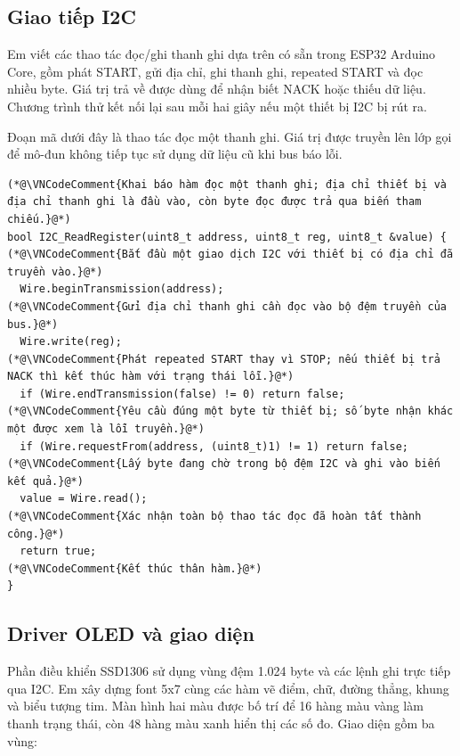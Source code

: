 \documentclass[12pt]{article}
\begin{document}
\subsection{Giao tiếp I2C}

Em viết các thao tác đọc/ghi thanh ghi dựa trên  có sẵn trong ESP32 Arduino Core, gồm phát START, gửi địa chỉ, ghi thanh ghi, repeated START và đọc nhiều byte. Giá trị trả về được dùng để nhận biết NACK hoặc thiếu dữ liệu. Chương trình thử kết nối lại sau mỗi hai giây nếu một thiết bị I2C bị rút ra.

Đoạn mã dưới đây là thao tác đọc một thanh ghi. Giá trị  được truyền lên lớp gọi để mô-đun không tiếp tục sử dụng dữ liệu cũ khi bus báo lỗi.

\Needspace{0.26\textheight}
\begin{lstlisting}[style=firmware,caption={Đọc thanh ghi I2C và kiểm tra lỗi truyền}]
(*@\VNCodeComment{Khai báo hàm đọc một thanh ghi; địa chỉ thiết bị và địa chỉ thanh ghi là đầu vào, còn byte đọc được trả qua biến tham chiếu.}@*)
bool I2C_ReadRegister(uint8_t address, uint8_t reg, uint8_t &value) {
(*@\VNCodeComment{Bắt đầu một giao dịch I2C với thiết bị có địa chỉ đã truyền vào.}@*)
  Wire.beginTransmission(address);
(*@\VNCodeComment{Gửi địa chỉ thanh ghi cần đọc vào bộ đệm truyền của bus.}@*)
  Wire.write(reg);
(*@\VNCodeComment{Phát repeated START thay vì STOP; nếu thiết bị trả NACK thì kết thúc hàm với trạng thái lỗi.}@*)
  if (Wire.endTransmission(false) != 0) return false;
(*@\VNCodeComment{Yêu cầu đúng một byte từ thiết bị; số byte nhận khác một được xem là lỗi truyền.}@*)
  if (Wire.requestFrom(address, (uint8_t)1) != 1) return false;
(*@\VNCodeComment{Lấy byte đang chờ trong bộ đệm I2C và ghi vào biến kết quả.}@*)
  value = Wire.read();
(*@\VNCodeComment{Xác nhận toàn bộ thao tác đọc đã hoàn tất thành công.}@*)
  return true;
(*@\VNCodeComment{Kết thúc thân hàm.}@*)
}
\end{lstlisting}

\subsection{Driver OLED và giao diện}

Phần điều khiển SSD1306 sử dụng vùng đệm 1.024 byte và các lệnh ghi trực tiếp qua I2C. Em xây dựng font 5x7 cùng các hàm vẽ điểm, chữ, đường thẳng, khung và biểu tượng tim. Màn hình hai màu được bố trí để 16 hàng màu vàng làm thanh trạng thái, còn 48 hàng màu xanh hiển thị các số đo. Giao diện gồm ba vùng:
\end{document}
